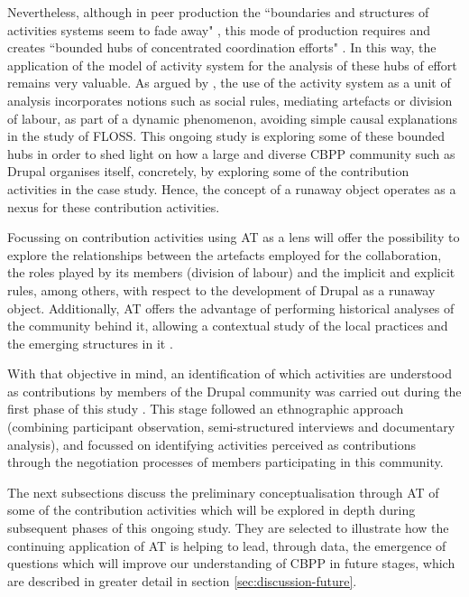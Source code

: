 \documentclass[a4paper, 12pt]{article}
\begin{document}
Nevertheless, although in peer production the ``boundaries and structures of activities systems seem to fade away" \parencite[309]{engestrom_future_2009}, this mode of production requires and creates ``bounded hubs of concentrated coordination efforts" \parencite[310]{engestrom_future_2009}. In this way, the application of the model of activity system for the analysis of these hubs of effort remains very valuable.
As argued by \textcite{Uden2007}, the use of the activity system as a unit of analysis incorporates notions such as social rules, mediating artefacts or division of labour, as part of a dynamic phenomenon, avoiding simple causal explanations in the study of FLOSS. This ongoing study is exploring some of these bounded hubs in order to shed light on how a large and diverse CBPP community such as Drupal organises itself, concretely, by exploring some of the contribution activities in the case study. Hence, the concept of a runaway object operates as a nexus for these contribution activities.

Focussing on contribution activities using AT as a lens will offer the possibility to explore the relationships between the artefacts employed for the collaboration, the roles played by its members (division of labour) and the implicit and explicit rules, among others, with respect to the development of Drupal as a runaway object. Additionally, AT offers the advantage of performing historical analyses of the community behind it, allowing a contextual study of the local practices and the emerging structures in it \parencite{Uden2007}.

With that objective in mind, an identification of which activities are understood as contributions by members of the Drupal community was carried out during the first phase of this study \parencite{rozas2015}.
This stage followed an ethnographic approach (combining participant observation, semi-structured interviews and documentary analysis), and focussed on identifying activities perceived as contributions through the negotiation processes of members participating in this community.

The next subsections discuss the preliminary conceptualisation through AT of some of the contribution activities which will be explored in depth during subsequent phases of this ongoing study. They are selected to illustrate how the continuing application of AT is helping to lead, through data, the emergence of questions which will improve our understanding of CBPP in future stages, which are described in greater detail in section \ref{sec:discussion-future}.
\end{document}
